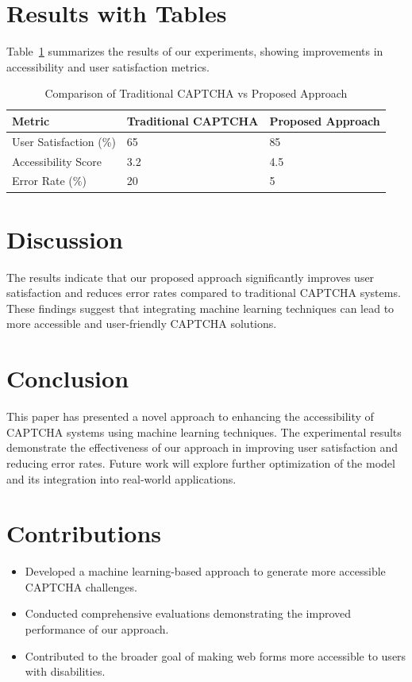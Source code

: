 \documentclass{article}
\begin{document}
\section{Results with Tables}
Table~\ref{table:results} summarizes the results of our experiments, showing improvements in accessibility and user satisfaction metrics.

\begin{table}[ht]
\centering
\begin{tabularx}{\textwidth}{|X|X|X|}
\hline
\textbf{Metric} & \textbf{Traditional CAPTCHA} & \textbf{Proposed Approach} \\
\hline
User Satisfaction (\%) & 65 & 85 \\
Accessibility Score & 3.2 & 4.5 \\
Error Rate (\%) & 20 & 5 \\
\hline
\end{tabularx}
\caption{Comparison of Traditional CAPTCHA vs Proposed Approach}
\label{table:results}
\end{table}

\section{Discussion}
The results indicate that our proposed approach significantly improves user satisfaction and reduces error rates compared to traditional CAPTCHA systems. These findings suggest that integrating machine learning techniques can lead to more accessible and user-friendly CAPTCHA solutions.

\section{Conclusion}
This paper has presented a novel approach to enhancing the accessibility of CAPTCHA systems using machine learning techniques. The experimental results demonstrate the effectiveness of our approach in improving user satisfaction and reducing error rates. Future work will explore further optimization of the model and its integration into real-world applications.

\section{Contributions}
\begin{itemize}
    \item Developed a machine learning-based approach to generate more accessible CAPTCHA challenges.
    \item Conducted comprehensive evaluations demonstrating the improved performance of our approach.
    \item Contributed to the broader goal of making web forms more accessible to users with disabilities.
\end{itemize}



\end{document}
